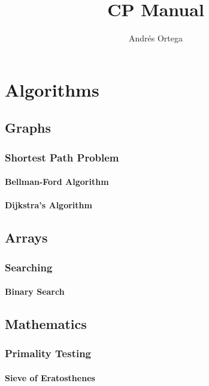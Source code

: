 \documentclass[12pt]{book}
\newcommand{\<}{\langle}
\renewcommand{\>}{\rangle}
\renewcommand{\(}{\left(}
\renewcommand{\)}{\right)}
\begin{document}
\title{CP Manual}
\author{Andrés Ortega}
\date{}

\maketitle

\tableofcontents

\chapter{Algorithms}
    \section{Graphs}
        \subsection{Shortest Path Problem}
            \subsubsection{Bellman-Ford Algorithm}
                
            \subsubsection{Dijkstra's Algorithm}
                
    \section{Arrays}
        \subsection{Searching}
            \subsubsection{Binary Search}
                

    \section{Mathematics}
        \subsection{Primality Testing}
            \subsubsection{Sieve of Eratosthenes}
                
\end{document}
